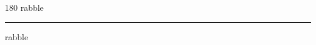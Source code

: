 
\begin{frame}
\begin{center}
\begin{turn}{180}
{\fontsize{2.5cm}{1em}\selectfont rabble}
\end{turn}
\vspace{1em}\par  
\hrule
\vspace{1em}\par  
{\fontsize{2.5cm}{1em}\selectfont rabble}
\end{center}
\end{frame}

